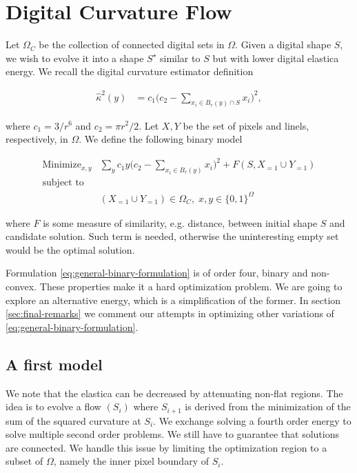 \documentclass[runningheads]{llncs}
\begin{document}
\section{Digital Curvature Flow}

	Let $\Omega_C$ be the collection of connected digital sets in $\Omega$. Given a digital shape $S$, we wish to evolve it into a shape $S^\star$ similar to $S$ but with lower digital elastica energy. We recall the digital curvature estimator definition
	
\begin{align}
	\hat{\kappa}^2(y) &= c_1\Big( c_2 - \sum_{x_i \in B_r(y) \cap S}{x_i} \Big)^2, 
	\label{eq:curvature-estimator-pixels}
\end{align}

where $c_1=3/r^6$ and $c_2=\pi r^2/2$. Let $X,Y$ be the set of pixels and linels, respectively, in $\Omega$. We define the following binary model
		
\begin{align}
\text{Minimize}_{x,y} & \sum_{y}{c_1y \Big(c_2 - \sum_{x_i \in B_r(y)}{x_i}\Big)^2	 } + F(S,X_{=1} \cup Y_{=1}) \nonumber \\
\text{subject to} & \nonumber \\
& (X_{=1} \cup Y_{=1}) \in \Omega_C, \; x,y \in \{0,1\}^\Omega
\label{eq:general-binary-formulation}
\end{align}


where $F$ is some measure of similarity, e.g. distance, between initial shape $S$ and candidate solution. Such term is needed, otherwise the uninteresting empty set would be the optimal solution.

Formulation \eqref{eq:general-binary-formulation} is of order four, binary and non-convex. These properties make it a hard optimization problem. We are going to explore an alternative energy, which is a simplification of the former. In section \ref{sec:final-remarks} we comment our attempts in optimizing  other variations of \eqref{eq:general-binary-formulation}.

\subsection{A first model}

We note that the elastica can be decreased by attenuating non-flat regions. The idea is to evolve a flow $(S_i)$ where $S_{i+1}$ is derived from the minimization of the sum of the squared curvature at $S_i$. We exchange solving a fourth order energy to solve multiple second order problems. We still have to guarantee that solutions are connected. We handle this issue by limiting the optimization region to a subset of $\Omega$, namely the inner pixel boundary of  $S_i$.
\end{document}
